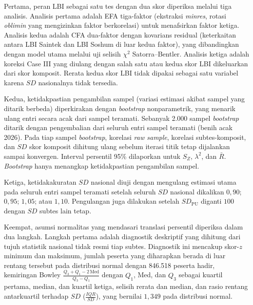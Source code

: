 Pertama, peran LBI sebagai satu tes dengan dua skor diperiksa melalui tiga analisis. Analisis pertama adalah EFA tiga-faktor (ekstraksi \textit{minres}, rotasi \textit{oblimin} yang mengizinkan faktor berkorelasi) untuk menafsirkan faktor ketiga. Analisis kedua adalah CFA dua-faktor dengan kovarians residual (keterkaitan antara LBI Saintek dan LBI Soshum di luar kedua faktor), yang dibandingkan dengan model utama melalui uji selisih $\chi^2$ Satorra--Bentler. Analisis ketiga adalah koreksi Case III yang diulang dengan salah satu atau kedua skor LBI dikeluarkan dari skor komposit. Rerata kedua skor LBI tidak dipakai sebagai satu variabel karena $SD$ nasionalnya tidak tersedia.

Kedua, ketidakpastian pengambilan sampel (variasi estimasi akibat sampel yang ditarik berbeda) diperkirakan dengan \textit{bootstrap} nonparametrik, yang menarik ulang entri secara acak dari sampel teramati. Sebanyak 2.000 sampel \textit{bootstrap} ditarik dengan pengembalian dari seluruh entri sampel teramati (benih acak 2026). Pada tiap sampel \textit{bootstrap}, korelasi \textit{raw sample}, korelasi subtes-komposit, dan $SD$ skor komposit dihitung ulang sebelum iterasi titik tetap dijalankan sampai konvergen. Interval persentil 95\% dilaporkan untuk $S_Z$, $\lambda^2$, dan $\bar{R}$. \textit{Bootstrap} hanya menangkap ketidakpastian pengambilan sampel.

Ketiga, ketidakakuratan $SD$ nasional diuji dengan mengulang estimasi utama pada seluruh entri sampel teramati setelah seluruh $SD$ nasional dikalikan $0,90$; $0,95$; $1,05$; atau $1,10$. Pengulangan juga dilakukan setelah $SD_{\text{PU}}$ diganti $100$ dengan $SD$ subtes lain tetap.

Keempat, asumsi normalitas yang mendasari translasi persentil diperiksa dalam dua langkah. Langkah pertama adalah diagnostik deskriptif yang dihitung dari tujuh statistik nasional tidak resmi tiap subtes. Diagnostik ini mencakup skor-$z$ minimum dan maksimum, jumlah peserta yang diharapkan berada di luar rentang tersebut pada distribusi normal dengan 846.518 peserta hadir, kemiringan Bowley $\frac{Q_3 + Q_1 - 2\,\text{Med}}{Q_3 - Q_1}$ dengan $Q_1$, Med, dan $Q_3$ sebagai kuartil pertama, median, dan kuartil ketiga, selisih rerata dan median, dan rasio rentang antarkuartil terhadap $SD$ ($\frac{IQR}{SD}$), yang bernilai $1,349$ pada distribusi normal.

